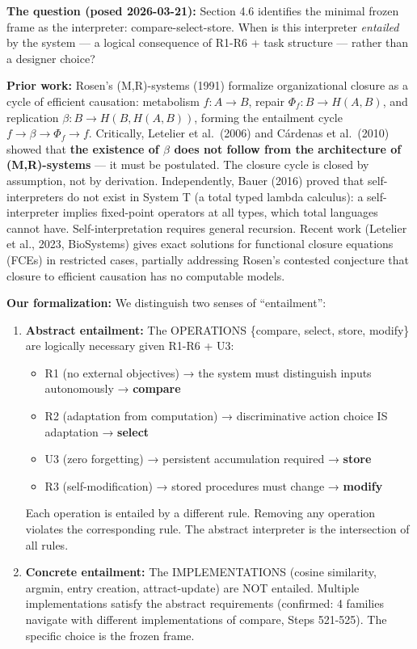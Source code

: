 \documentclass[
  11pt,
]{article}
\providecommand{\tightlist}{%
  \setlength{\itemsep}{0pt}\setlength{\parskip}{0pt}}
\begin{document}
\textbf{The question (posed 2026-03-21):} Section 4.6 identifies the
minimal frozen frame as the interpreter: compare-select-store. When is
this interpreter \emph{entailed} by the system --- a logical consequence
of R1-R6 + task structure --- rather than a designer choice?

\textbf{Prior work:} Rosen's (M,R)-systems (1991) formalize
organizational closure as a cycle of efficient causation: metabolism
\(f: A \to B\), repair \(\Phi_f: B \to H(A,B)\), and replication
\(\beta: B \to H(B, H(A,B))\), forming the entailment cycle
\(f \to \beta \to \Phi_f \to f\). Critically, Letelier et al.~(2006) and
Cárdenas et al.~(2010) showed that \textbf{the existence of \(\beta\)
does not follow from the architecture of (M,R)-systems} --- it must be
postulated. The closure cycle is closed by assumption, not by
derivation. Independently, Bauer (2016) proved that self-interpreters do
not exist in System T (a total typed lambda calculus): a
self-interpreter implies fixed-point operators at all types, which total
languages cannot have. Self-interpretation requires general recursion.
Recent work (Letelier et al., 2023, BioSystems) gives exact solutions
for functional closure equations (FCEs) in restricted cases, partially
addressing Rosen's contested conjecture that closure to efficient
causation has no computable models.

\textbf{Our formalization:} We distinguish two senses of ``entailment'':

\begin{enumerate}
\def\labelenumi{\arabic{enumi}.}
\item
  \textbf{Abstract entailment:} The OPERATIONS \{compare, select, store,
  modify\} are logically necessary given R1-R6 + U3:

  \begin{itemize}
  \tightlist
  \item
    R1 (no external objectives) → the system must distinguish inputs
    autonomously → \textbf{compare}
  \item
    R2 (adaptation from computation) → discriminative action choice IS
    adaptation → \textbf{select}
  \item
    U3 (zero forgetting) → persistent accumulation required →
    \textbf{store}
  \item
    R3 (self-modification) → stored procedures must change →
    \textbf{modify}
  \end{itemize}

  Each operation is entailed by a different rule. Removing any operation
  violates the corresponding rule. The abstract interpreter is the
  intersection of all rules.
\item
  \textbf{Concrete entailment:} The IMPLEMENTATIONS (cosine similarity,
  argmin, entry creation, attract-update) are NOT entailed. Multiple
  implementations satisfy the abstract requirements (confirmed: 4
  families navigate with different implementations of compare, Steps
  521-525). The specific choice is the frozen frame.
\end{enumerate}
\end{document}
